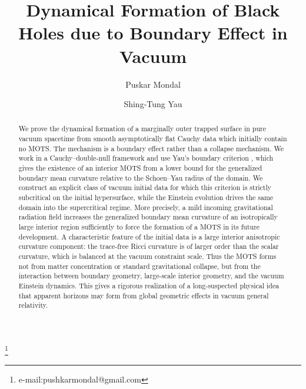 \documentclass{amsart}
\begin{document}
	
\title{Dynamical Formation of Black Holes due to Boundary Effect in Vacuum}%


\author{Puskar Mondal}\footnote{e-mail:pushkarmondal@gmail.com}%
\author{Shing-Tung Yau} %



\maketitle

	






\begin{abstract}
\noindent  We prove the dynamical formation of a marginally outer trapped surface in pure vacuum spacetime from smooth asymptotically flat Cauchy data which initially contain no MOTS. The mechanism is a boundary effect rather than a collapse mechanism. We work in a Cauchy--double-null framework and use Yau's boundary criterion \cite{yau}, which gives the existence of an interior MOTS from a lower bound for the generalized boundary mean curvature relative to the Schoen--Yau radius of the domain. We construct an explicit class of vacuum initial data for which this criterion is strictly subcritical on the initial hypersurface, while the Einstein evolution drives the same domain into the supercritical regime. More precisely, a mild incoming gravitational radiation field increases the generalized boundary mean curvature of an isotropically large interior region sufficiently to force the formation of a MOTS in its future development. A characteristic feature of the initial data is a large interior anisotropic curvature component: the trace-free Ricci curvature is of larger order than the scalar curvature, which is balanced at the vacuum constraint scale. Thus the MOTS forms not from matter concentration or standard gravitational collapse, but from the interaction between boundary geometry, large-scale interior geometry, and the vacuum Einstein dynamics. This gives a rigorous realization of a long-suspected physical idea that apparent horizons may form from global geometric effects in vacuum general relativity.


\end{abstract}
\end{document}
